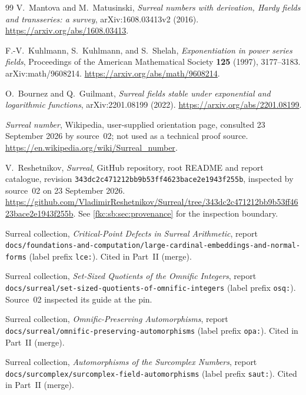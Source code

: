 \documentclass[11pt,letterpaper]{article}
\numberwithin{equation}{section}
\theoremstyle{definition}
\theoremstyle{remark}
\begin{document}
\begin{thebibliography}{99}
V.~Mantova and M.~Matusinski,
\emph{Surreal numbers with derivation, Hardy fields and transseries: a survey},
arXiv:1608.03413v2 (2016).
\url{https://arxiv.org/abs/1608.03413}.

F.-V.~Kuhlmann, S.~Kuhlmann, and S.~Shelah,
\emph{Exponentiation in power series fields},
Proceedings of the American Mathematical Society \textbf{125} (1997), 3177--3183.
arXiv:math/9608214.
\url{https://arxiv.org/abs/math/9608214}.

O.~Bournez and Q.~Guilmant,
\emph{Surreal fields stable under exponential and logarithmic functions},
arXiv:2201.08199 (2022).
\url{https://arxiv.org/abs/2201.08199}.

\emph{Surreal number}, Wikipedia, user-supplied orientation page, consulted 23 September 2026 by source~02; not used as a technical proof source.
\url{https://en.wikipedia.org/wiki/Surreal_number}.

\begingroup\raggedright
V.~Reshetnikov,
\emph{Surreal}, GitHub repository, root README and report catalogue, revision
\texttt{343dc2c471212bb9b53ff4623bace2e1943f255b}, inspected by source~02 on 23 September 2026.
\url{https://github.com/VladimirReshetnikov/Surreal/tree/343dc2c471212bb9b53ff4623bace2e1943f255b}.
See \cref{fkc:sb:sec:provenance} for the inspection boundary.
\par\endgroup

\begingroup\raggedright
{}
Surreal collection, \emph{Critical-Point Defects in Surreal Arithmetic},
report \nolinkurl{docs/foundations-and-computation/large-cardinal-embeddings-and-normal-forms}
(label prefix \texttt{lce:}). Cited in Part~II (merge).

Surreal collection, \emph{Set-Sized Quotients of the Omnific Integers},
report \nolinkurl{docs/surreal/set-sized-quotients-of-omnific-integers}
(label prefix \texttt{osq:}). Source~02 inspected its guide at the pin.

Surreal collection, \emph{Omnific-Preserving Automorphisms},
report \nolinkurl{docs/surreal/omnific-preserving-automorphisms}
(label prefix \texttt{opa:}). Cited in Part~II (merge).

Surreal collection, \emph{Automorphisms of the Surcomplex Numbers},
report \nolinkurl{docs/surcomplex/surcomplex-field-automorphisms}
(label prefix \texttt{saut:}). Cited in Part~II (merge).
\par\endgroup

\end{thebibliography}
\end{document}
